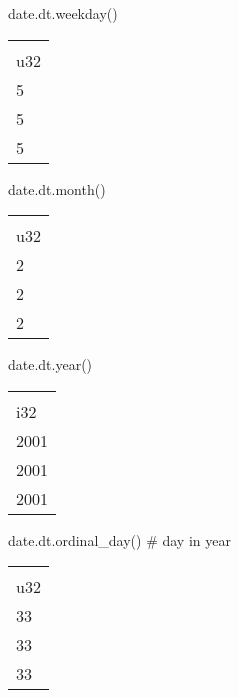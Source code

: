 \documentclass[
  letterpaper,
  DIV=11,
  numbers=noendperiod]{scrartcl}
\newenvironment{Shaded}{\begin{snugshade}}{\end{snugshade}}
\newcommand{\CommentTok}[1]{\textcolor[rgb]{0.37,0.37,0.37}{#1}}
\newcommand{\NormalTok}[1]{\textcolor[rgb]{0.00,0.23,0.31}{#1}}
\begin{document}
\begin{Shaded}
\begin{Highlighting}[]
\NormalTok{date.dt.weekday()}
\end{Highlighting}
\end{Shaded}

\begin{longtable}[]{@{}l@{}}
\toprule()
 \\
u32 \\
\midrule()
\endhead
5 \\
5 \\
5 \\
\bottomrule()
\end{longtable}

\begin{Shaded}
\begin{Highlighting}[]
\NormalTok{date.dt.month()}
\end{Highlighting}
\end{Shaded}

\begin{longtable}[]{@{}l@{}}
\toprule()
 \\
u32 \\
\midrule()
\endhead
2 \\
2 \\
2 \\
\bottomrule()
\end{longtable}

\begin{Shaded}
\begin{Highlighting}[]
\NormalTok{date.dt.year()}
\end{Highlighting}
\end{Shaded}

\begin{longtable}[]{@{}l@{}}
\toprule()
 \\
i32 \\
\midrule()
\endhead
2001 \\
2001 \\
2001 \\
\bottomrule()
\end{longtable}

\begin{Shaded}
\begin{Highlighting}[]
\NormalTok{date.dt.ordinal\_day() }\CommentTok{\# day in year}
\end{Highlighting}
\end{Shaded}

\begin{longtable}[]{@{}l@{}}
\toprule()
 \\
u32 \\
\midrule()
\endhead
33 \\
33 \\
33 \\
\bottomrule()
\end{longtable}
\end{document}
